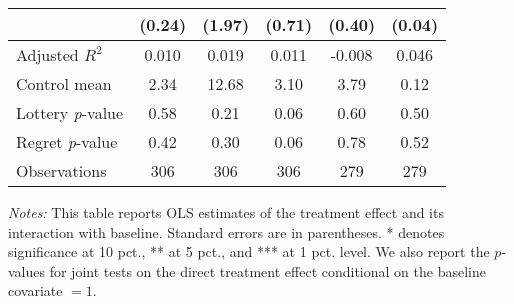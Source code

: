 \begin{table}[htbp]
{\begin{threeparttable}
\begin{tabular}{l*{5}{c}}
                &   (0.24)         &   (1.97)         &   (0.71)         &   (0.40)         &   (0.04)         \\
\midrule
Adjusted \(R^{2}\)&    0.010         &    0.019         &    0.011         &   -0.008         &    0.046         \\
Control mean    &     2.34         &    12.68         &     3.10         &     3.79         &     0.12         \\
Lottery \emph{p}-value&     0.58         &     0.21         &     0.06         &     0.60         &     0.50         \\
Regret \emph{p}-value&     0.42         &     0.30         &     0.06         &     0.78         &     0.52         \\
Observations    &      306         &      306         &      306         &      279         &      279         \\
\bottomrule \end{tabular} \begin{tablenotes}[flushleft] \footnotesize \item \emph{Notes:} This table reports OLS estimates of the treatment effect and its interaction with baseline. Standard errors are in parentheses. * denotes significance at 10 pct., ** at 5 pct., and *** at 1 pct. level. We also report the \(p\)-values for joint tests on the direct treatment effect conditional on the baseline covariate $= 1$. \end{tablenotes} \end{threeparttable} } \end{table}
